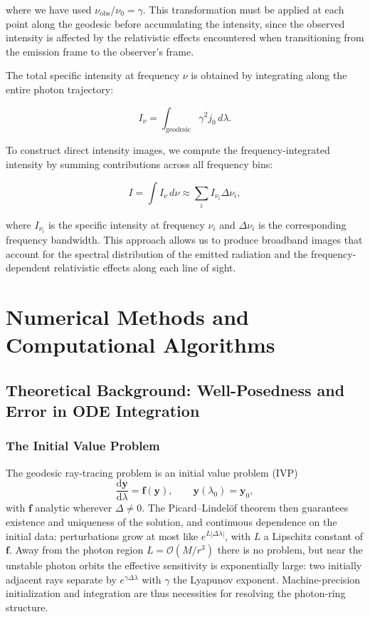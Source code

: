 \documentclass[11pt]{book}
\begin{document}
where we have used $\nu_{\mathrm{obs}}/\nu_0 = \gamma$. This transformation must be applied at each point along the geodesic before accumulating the intensity, since the observed intensity is affected by the relativistic effects encountered when transitioning from the emission frame to the observer's frame.

The total specific intensity at frequency $\nu$ is obtained by integrating along the entire photon trajectory:

\begin{equation}
	I_\nu = \int_{\mathrm{geodesic}} \gamma^2 j_0 \, d\lambda.
	\label{eq:total_intensity}
\end{equation}

To construct direct intensity images, we compute the frequency-integrated intensity by summing contributions across all frequency bins:

\begin{equation}
	I = \int I_\nu \, d\nu \approx \sum_i I_{\nu_i} \Delta\nu_i,
	\label{eq:frequency_integration}
\end{equation}

where $I_{\nu_i}$ is the specific intensity at frequency $\nu_i$ and $\Delta\nu_i$ is the corresponding frequency bandwidth. This approach allows us to produce broadband images that account for the spectral distribution of the emitted radiation and the frequency-dependent relativistic effects along each line of sight.

\chapter{Numerical Methods and Computational Algorithms}

\section{Theoretical Background: Well-Posedness and Error in ODE Integration}

\subsection{The Initial Value Problem}
The geodesic ray-tracing problem is an initial value problem (IVP)
\begin{equation}
    \frac{\mathrm{d}\bm{y}}{\mathrm{d}\lambda} = \bm{f}(\bm{y}), \qquad
    \bm{y}(\lambda_0) = \bm{y}_0 ,
\end{equation}
with $\bm{f}$ analytic wherever $\Delta \neq 0$. The Picard--Lindel\"of theorem then
guarantees existence and uniqueness of the solution, and continuous dependence on the
initial data: perturbations grow at most like $e^{L|\Delta\lambda|}$, with $L$ a
Lipschitz constant of $\bm{f}$. Away from the
photon region $L = \mathcal{O}(M/r^3)$ there is no problem, but near the unstable photon orbits
the effective sensitivity is exponentially large: two initially adjacent rays separate
by $e^{\gamma\Delta\lambda}$ with $\gamma$ the Lyapunov exponent.
Machine-precision initialization and integration are thus necessities for resolving the photon-ring structure.
\end{document}
